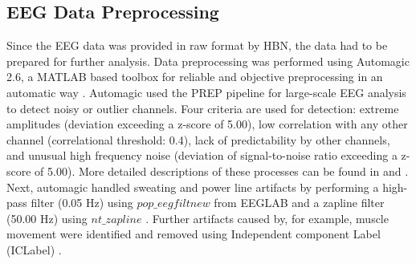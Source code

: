 \subsection{EEG Data Preprocessing} \label{EEGdatapre}
Since the EEG data was provided in raw format by HBN, the data had to be prepared for further analysis. Data preprocessing was performed using Automagic 2.6, a MATLAB based toolbox for reliable and objective preprocessing in an automatic way \parencite{pedroniAutomagicStandardizedPreprocessing2019}.
Automagic used the PREP pipeline for large-scale EEG analysis \parencite{bigdely-shamloPREPPipelineStandardized2015} to detect noisy or outlier channels. Four criteria are used for detection: extreme amplitudes (deviation exceeding a z-score of 5.00), low correlation with any other channel (correlational threshold: 0.4), lack of predictability by other channels, and unusual high frequency noise (deviation of signal-to-noise ratio exceeding a z-score of 5.00). More detailed descriptions of these processes can be found in \textcite{pedroniAutomagicStandardizedPreprocessing2019} and \textcite{bigdely-shamloPREPPipelineStandardized2015}. Next, automagic handled sweating and power line artifacts by performing a high-pass filter (0.05 Hz) using $pop\_eegfiltnew$ from EEGLAB \parencite{widmannFilterEffectsFilter2012} and a zapline filter (50.00 Hz) using $nt\_zapline$ \parencite[NoiseTools,]{decheveigneZapLineSimpleEffective2020}. Further artifacts caused by, for example, muscle movement were identified and removed using Independent component Label (ICLabel) \parencite{pion-tonachiniICLabelAutomatedElectroencephalographic2019}. 


